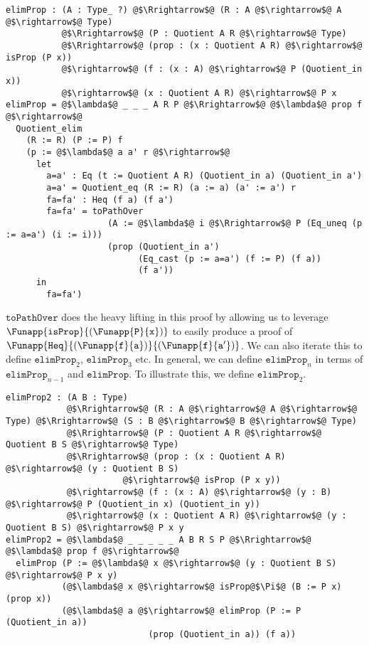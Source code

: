 \documentclass[12pt,twoside,maitrise]{dms}
\theoremstyle{definition}
\numberwithin{equation}{section}
\numberwithin{table}{chapter}
\numberwithin{figure}{chapter}
\newcommand\id[1] {\texttt{#1}}
\newcommand\fn[1] {\texttt{#1}}
\begin{document}
\begin{verbatim}
elimProp : (A : Type_ ?) @$\Rrightarrow$@ (R : A @$\rightarrow$@ A @$\rightarrow$@ Type)
           @$\Rrightarrow$@ (P : Quotient A R @$\rightarrow$@ Type)
           @$\Rrightarrow$@ (prop : (x : Quotient A R) @$\rightarrow$@ isProp (P x))
           @$\rightarrow$@ (f : (x : A) @$\rightarrow$@ P (Quotient_in x))
           @$\rightarrow$@ (x : Quotient A R) @$\rightarrow$@ P x
elimProp = @$\lambda$@ _ _ _ A R P @$\Rrightarrow$@ @$\lambda$@ prop f @$\rightarrow$@
  Quotient_elim
    (R := R) (P := P) f
    (p := @$\lambda$@ a a' r @$\rightarrow$@
      let
        a=a' : Eq (t := Quotient A R) (Quotient_in a) (Quotient_in a')
        a=a' = Quotient_eq (R := R) (a := a) (a' := a') r
        fa=fa' : Heq (f a) (f a')
        fa=fa' = toPathOver
                    (A := @$\lambda$@ i @$\Rrightarrow$@ P (Eq_uneq (p := a=a') (i := i)))
                    (prop (Quotient_in a')
                          (Eq_cast (p := a=a') (f := P) (f a))
                          (f a'))
      in
        fa=fa')
\end{verbatim}

$\fn{toPathOver}$ does the heavy lifting in this proof by allowing us to leverage $\Funapp{\fn{isProp}}{(\Funapp{\id{P}}{\id{x}})}$ to easily produce a proof of $\Funapp{\id{Heq}}{(\Funapp{\id{f}}{\id{a}})}{(\Funapp{\id{f}}{\id{a}'})}$. We can also iterate this to define $\fn{elimProp}_2$, $\fn{elimProp}_3$ etc. In general, we can define $\fn{elimProp}_n$ in terms of $\fn{elimProp}_{n-1}$ and $\fn{elimProp}$. To illustrate this, we define $\fn{elimProp}_2$.

\begin{verbatim}
elimProp2 : (A B : Type)
            @$\Rrightarrow$@ (R : A @$\rightarrow$@ A @$\rightarrow$@ Type) @$\Rrightarrow$@ (S : B @$\rightarrow$@ B @$\rightarrow$@ Type)
            @$\Rrightarrow$@ (P : Quotient A R @$\rightarrow$@ Quotient B S @$\rightarrow$@ Type)
            @$\Rrightarrow$@ (prop : (x : Quotient A R) @$\rightarrow$@ (y : Quotient B S)
                       @$\rightarrow$@ isProp (P x y))
            @$\rightarrow$@ (f : (x : A) @$\rightarrow$@ (y : B) @$\rightarrow$@ P (Quotient_in x) (Quotient_in y))
            @$\rightarrow$@ (x : Quotient A R) @$\rightarrow$@ (y : Quotient B S) @$\rightarrow$@ P x y
elimProp2 = @$\lambda$@ _ _ _ _ _ A B R S P @$\Rrightarrow$@ @$\lambda$@ prop f @$\rightarrow$@
  elimProp (P := @$\lambda$@ x @$\rightarrow$@ (y : Quotient B S) @$\rightarrow$@ P x y)
           (@$\lambda$@ x @$\rightarrow$@ isProp@$\Pi$@ (B := P x) (prop x))
           (@$\lambda$@ a @$\rightarrow$@ elimProp (P := P (Quotient_in a))
                            (prop (Quotient_in a)) (f a))
\end{verbatim}
\end{document}
